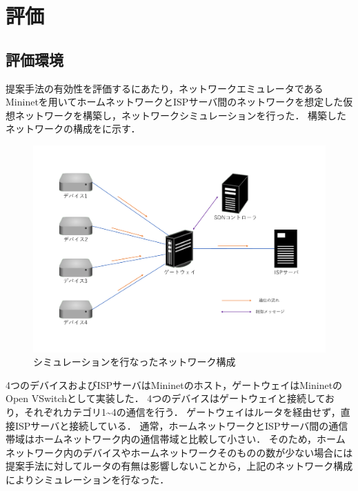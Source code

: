 \documentclass[a4paper,11pt,uplatex]{ujreport}
\begin{document}

\chapter{評価}
\label{chap:評価}

\section{評価環境}
\label{評価環境}

  提案手法の有効性を評価するにあたり，ネットワークエミュレータであるMininetを用いてホームネットワークとISPサーバ間のネットワークを想定した仮想ネットワークを構築し，ネットワークシミュレーションを行った．
  構築したネットワークの構成をに示す．\par

  \begin{figure}[!b]
    \centering
    \includegraphics[width=\linewidth]{img/experiment.pdf}
    \caption{シミュレーションを行なったネットワーク構成}
    \label{fig:experiment}
  \end{figure}

  4つのデバイスおよびISPサーバはMininetのホスト，ゲートウェイはMininetのOpen VSwitchとして実装した．
  4つのデバイスはゲートウェイと接続しており，それぞれカテゴリ1\textasciitilde4の通信を行う．
  ゲートウェイはルータを経由せず，直接ISPサーバと接続している．
  通常，ホームネットワークとISPサーバ間の通信帯域はホームネットワーク内の通信帯域と比較して小さい．
  そのため，ホームネットワーク内のデバイスやホームネットワークそのものの数が少ない場合には提案手法に対してルータの有無は影響しないことから，上記のネットワーク構成によりシミュレーションを行なった．
  
\end{document}
